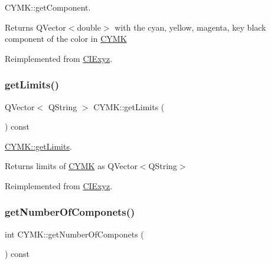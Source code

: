 C\+Y\+M\+K\+::get\+Component. 

\begin{DoxyReturn}{Returns}
Q\+Vector$<$double$>$ with the cyan, yellow, magenta, key black component of the color in \hyperlink{class_c_y_m_k}{C\+Y\+MK} 
\end{DoxyReturn}


Reimplemented from \hyperlink{class_c_i_exyz_af8992e3ac1741c35fcb18aa2cdb554a0}{C\+I\+Exyz}.

\mbox{\label{class_c_y_m_k_a9e0f2df82394cab1f95782f381c560ab}} 
\subsubsection{\texorpdfstring{get\+Limits()}{getLimits()}}
{\footnotesize\ttfamily Q\+Vector$<$ Q\+String $>$ C\+Y\+M\+K\+::get\+Limits (\begin{DoxyParamCaption}{ }\end{DoxyParamCaption}) const\hspace{0.3cm}{\ttfamily [virtual]}}



\hyperlink{class_c_y_m_k_a9e0f2df82394cab1f95782f381c560ab}{C\+Y\+M\+K\+::get\+Limits}. 

\begin{DoxyReturn}{Returns}
limits of \hyperlink{class_c_y_m_k}{C\+Y\+MK} as Q\+Vector$<$\+Q\+String$>$ 
\end{DoxyReturn}


Reimplemented from \hyperlink{class_c_i_exyz_a4c3aa6777f7720ae26b53174322a83f8}{C\+I\+Exyz}.

\mbox{\label{class_c_y_m_k_ab3f005a1cc28f715192ad4fc90ded6b8}} 
\subsubsection{\texorpdfstring{get\+Number\+Of\+Componets()}{getNumberOfComponets()}}
{\footnotesize\ttfamily int C\+Y\+M\+K\+::get\+Number\+Of\+Componets (\begin{DoxyParamCaption}{ }\end{DoxyParamCaption}) const\hspace{0.3cm}{\ttfamily [virtual]}}



